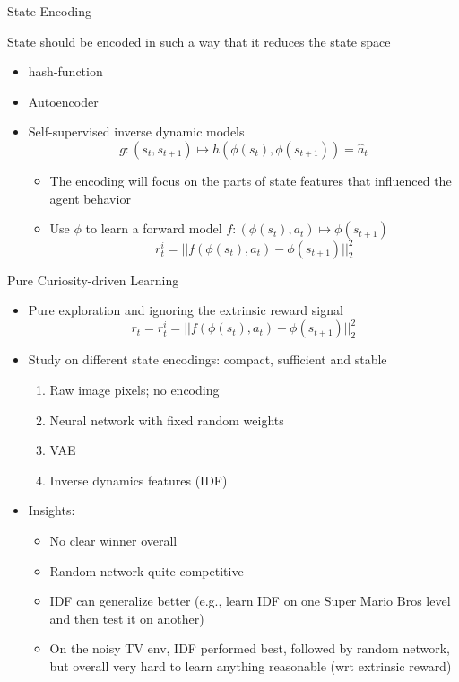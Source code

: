 \documentclass[aspectratio=169]{../latex_main/tntbeamer}  %
\begin{document}
\begin{frame}[c]{State Encoding}
	

	State should be encoded in such a way that it reduces the state space
	\begin{itemize}
		\item hash-function~
		\item Autoencoder~
		\item Self-supervised inverse dynamic models~
		$$g: (s_t, s_{t+1}) \mapsto h(\phi(s_t), \phi(s_{t+1})) = \hat{a}_t $$
		\begin{itemize}
			\item The encoding will focus on the parts of state features that influenced the agent behavior
			\item Use $\phi$ to learn a forward model $f: (\phi(s_t), a_t) \mapsto \phi(s_{t+1})$
			$$ r_t^i = || f(\phi(s_{t}), a_t) - \phi(s_{t+1})||^2_2$$
		\end{itemize}
	\end{itemize}
	
	
\end{frame}
\begin{frame}[c]{Pure Curiosity-driven Learning~}
	
	\begin{itemize}
		\item Pure exploration and ignoring the extrinsic reward signal
		$$r_t  = r_t^i = ||f(\phi(s_t), a_t) - \phi(s_{t+1}) ||_2^2 $$
		\item Study on different state encodings: compact, sufficient and stable
		\begin{enumerate}
			\item Raw image pixels; no encoding
			\item Neural network with fixed random weights
			\item VAE
			\item Inverse dynamics features (IDF)
		\end{enumerate}
		\item Insights:
		\begin{itemize}
			\item No clear winner overall
			\item Random network quite competitive
			\item IDF can generalize better (e.g., learn IDF on one Super Mario Bros level and then test it on another)
			\item On the noisy TV env, IDF performed best, followed by random network, but overall very hard to learn anything reasonable (wrt extrinsic reward)
		\end{itemize}
	\end{itemize}
	
	
\end{frame}
\end{document}
